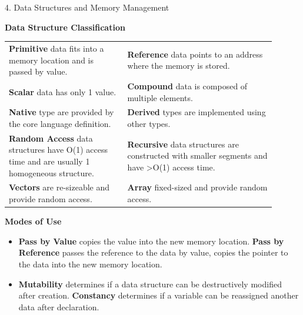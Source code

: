 \begin{center}
     \Large{4. Data Structures and Memory Management}
\end{center}

\begin{center}
     \textbf{Data Structure Classification}
\end{center}
\begin{center}
    \begin{tabular}{ p{0.4\linewidth} p{0.5\linewidth} }
    \hline
    \textbf{Primitive} data fits into a memory location and is passed by value.
    & \textbf{Reference} data points to an address where the memory is stored. \\
    \rowcolor{yellow}
    \textbf{Scalar} data has only 1 value. & \textbf{Compound} data is composed of multiple elements. \\
    \textbf{Native} type are provided by the core language definition. & \textbf{Derived} types are implemented using other types. \\
    \rowcolor{yellow}
    \textbf{Random Access} data structures have O(1) access time and are usually 1 homogeneous structure.
    & \textbf{Recursive} data structures are constructed with smaller segments and have >O(1) access time. \\
    \textbf{Vectors} are re-sizeable and provide random access. & \textbf{Array} fixed-sized and provide random access. \\
    \hline
    \end{tabular}
\end{center}

\begin{center}
     \textbf{Modes of Use}
\end{center}
\begin{itemize}
    \item \textbf{Pass by Value} copies the value into the new memory location. \textbf{Pass by Reference} passes the reference to the data by value, copies the pointer to the data into the new memory location.
    \item \textbf{Mutability} determines if a data structure can be destructively modified after creation. \textbf{Constancy} determines if a variable can be reassigned another data after declaration.
\end{itemize}

